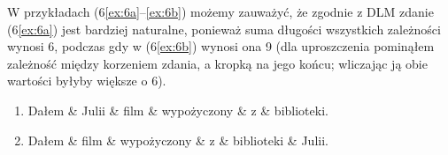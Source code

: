 \documentclass[licencjacka]{pracamgr_Kogni}
\begin{document}
    W przykładach (6\ref{ex:6a}--\ref{ex:6b}) możemy zauważyć, że zgodnie z DLM zdanie (6\ref{ex:6a}) jest bardziej naturalne, ponieważ suma długości wszystkich zależności wynosi 6, podczas gdy w (6\ref{ex:6b}) wynosi ona 9 (dla uproszczenia pominąłem zależność między korzeniem zdania, a kropką na jego końcu; wliczając ją obie wartości byłyby większe o 6).

    \begin{exe}
        \ex
        \begin{enumerate}[label=\alph{enumi}., ref=\alph{enumi}]
            \item {\begin{dependency}[theme=simple, segmented edge, baseline=4.6em]
                       \begin{deptext}[column sep=2em]
                           Dałem \& Julii \& film \& wypożyczony \& z \& biblioteki.\\
                       \end{deptext}
            \end{dependency}
                \label{ex:6a}}
            \item {\begin{dependency}[theme=simple, segmented edge, baseline=4.6em]
                       \begin{deptext}[column sep=2em]
                           Dałem \& film \& wypożyczony \& z \& biblioteki \& Julii.\\
                       \end{deptext}
            \end{dependency}
                \label{ex:6b}}
        \end{enumerate}
        \label{ex:6}
    \end{exe}
\end{document}
